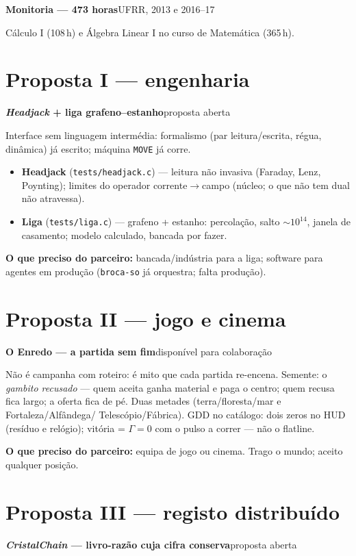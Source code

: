 \documentclass[11pt,a4paper]{article}
\newcommand{\lin}[2]{\noindent\textbf{#1}\hfill{\color{cinza}\small #2}\par}
\begin{document}
\smallskip
\lin{Monitoria --- 473 horas}{UFRR, 2013 e 2016--17}
Cálculo I (108\,h) e Álgebra Linear I no curso de Matemática (365\,h).

\section*{Proposta I --- engenharia}

\lin{\emph{Headjack} + liga grafeno--estanho}{proposta aberta}

Interface sem linguagem intermédia: formalismo (par leitura/escrita, régua, dinâmica) já
escrito; máquina \texttt{MOVE} já corre.
\begin{itemize}
\item \textbf{Headjack} (\texttt{tests/headjack.c}) --- leitura não invasiva (Faraday, Lenz,
Poynting); limites do operador corrente$\to$campo (núcleo; o que não tem dual não atravessa).
\item \textbf{Liga} (\texttt{tests/liga.c}) --- grafeno + estanho: percolação, salto
$\sim 10^{14}$, janela de casamento; modelo calculado, bancada por fazer.
\end{itemize}

\textbf{O que preciso do parceiro:} bancada/indústria para a liga; software para agentes
em produção (\texttt{broca-so} já orquestra; falta produção).

\section*{Proposta II --- jogo e cinema}

\lin{O Enredo --- a partida sem fim}{disponível para colaboração}

Não é campanha com roteiro: é mito que cada partida re-encena. Semente: o
\emph{gambito recusado} --- quem aceita ganha material e paga o centro; quem recusa fica
largo; a oferta fica de pé. Duas metades (terra/floresta/mar e Fortaleza/Alfândega/
Telescópio/Fábrica). GDD no catálogo: dois zeros no HUD (resíduo e relógio); vitória =
$\Gamma=0$ com o pulso a correr --- não o flatline.

\smallskip
\textbf{O que preciso do parceiro:} equipa de jogo ou cinema. Trago o mundo; aceito
qualquer posição.

\section*{Proposta III --- registo distribuído}

\lin{\emph{CristalChain} --- livro-razão cuja cifra conserva}{proposta aberta}
\end{document}
